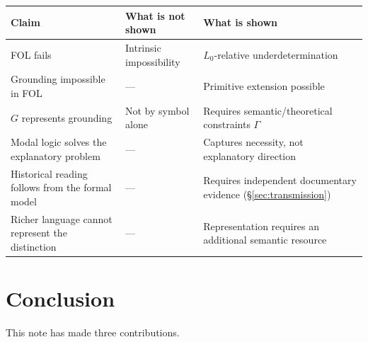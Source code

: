 \documentclass[11pt]{article}
\theoremstyle{plain}
\theoremstyle{definition}
\theoremstyle{remark}
\begin{document}
\begin{center}
\begin{tabular}{@{}p{3.6cm}p{4.0cm}p{4.6cm}@{}}
\toprule
\textbf{Claim} & \textbf{What is not shown} & \textbf{What is shown}\\
\midrule
FOL fails & Intrinsic impossibility & $L_0$-relative underdetermination\\
Grounding impossible in FOL & --- & Primitive extension possible\\
$G$ represents grounding & Not by symbol alone & Requires semantic/theoretical constraints $\Gamma$\\
Modal logic solves the explanatory problem & --- & Captures necessity, not explanatory direction\\
Historical reading follows from the formal model & --- & Requires independent documentary evidence (\S\ref{sec:transmission})\\
Richer language cannot represent the distinction & --- & Representation requires an additional semantic resource\\
\bottomrule
\end{tabular}
\end{center}

\section{Conclusion}
\label{sec:conclusion}

This note has made three contributions.
\end{document}
